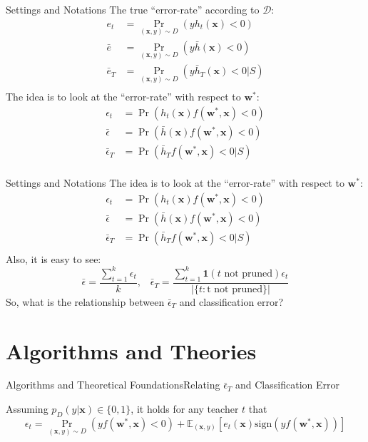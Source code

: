 \documentclass[10pt,table,mathserif]{beamer}
\begin{document}
\begin{frame}{Settings and Notations}
  The true ``error-rate'' according to $\mathcal{D}$:
  \begin{align*}
    e_t & =  \Pr_{(\mathbf{x}, y) \sim D}(y h_t (\mathbf{x})<0)\\
    \bar{e} & =  \Pr_{(\mathbf{x}, y) \sim D}(y \bar{h} (\mathbf{x})<0)\\
    \bar{e}_T & =  \Pr_{(\mathbf{x}, y) \sim D}(y \bar{h}_T (\mathbf{x})<0 |S)\\
  \end{align*} \pause
  The idea is to look at the ``error-rate'' with respect to $\mathbf{w}^*$:\\
  \begin{align*}
    \epsilon_t & =  \Pr(h_t (\mathbf{x}) f(\mathbf{w^*, x})<0)\\
    \bar{\epsilon} & =  \Pr (\bar{h}(\mathbf{x}) f(\mathbf{w^*, x})<0)\\
    \bar{\epsilon}_T & =  \Pr (\bar{h}_T f(\mathbf{w^*, x})<0 | S)\\
  \end{align*}\vspace{-2ex}
\end{frame}

\begin{frame}{Settings and Notations}
  The idea is to look at the ``error-rate'' with respect to $\mathbf{w}^*$:\\
  \begin{align*}
    \epsilon_t & =  \Pr(h_t (\mathbf{x}) f(\mathbf{w^*, x})<0)\\
    \bar{\epsilon} & =  \Pr (\bar{h}(\mathbf{x}) f(\mathbf{w^*, x})<0)\\
    \bar{\epsilon}_T & =  \Pr (\bar{h}_T f(\mathbf{w^*, x})<0 | S)\\
  \end{align*}\vspace{-2ex}
  Also, it is easy to see:\\
  \[\bar{\epsilon} = \frac{\sum^k_{t=1}\epsilon_t}{k}, \,\,\,\,\, \bar{\epsilon}_T = \frac{\sum^k_{t=1}\mathbf{1}(t \text{ not pruned})\epsilon_t}{|\{t: \text{t not pruned}\}|}\]
  \pause
  So, what is the relationship between $\bar{\epsilon}_T$ and classification error?
\end{frame}

\section{Algorithms and Theories}
\begin{frame}{Algorithms and Theoretical Foundations}{Relating $\bar{\epsilon}_T$ and Classification Error}
  \begin{theorem}
    Assuming $p_D(y|\mathbf{x})\in \{0,1\}$, it holds for any teacher $t$ that
    \[\epsilon_t = \underset{{(\mathbf{x},y)}\sim D}{\Pr}(yf(\mathbf{w}^*, \mathbf{x})<0) + \mathbb{E}_{(\mathbf{x},y)}[e_t(\mathbf{x})\text{sign}(yf(\mathbf{w}^*,\mathbf{x}))]\]
    \label{the1}
  \end{theorem}
\end{frame}
\end{document}
